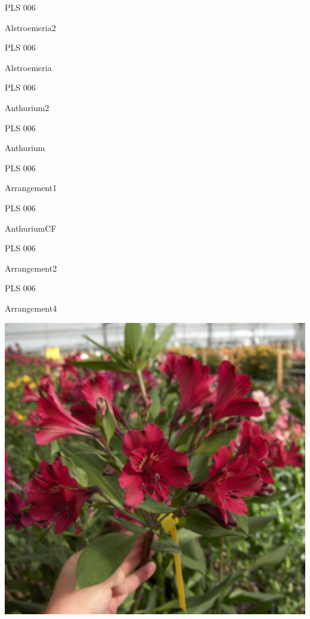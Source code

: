 \documentclass{article}
\begin{document}
\noindent  PLS 006
\vfill
\centerline{{\huge Alstroemeria2 }}
\vfill
\newpage

\noindent  PLS 006
\vfill
\centerline{{\huge Alstroemeria }}
\vfill
\newpage

\noindent  PLS 006
\vfill
\centerline{{\huge Anthurium2 }}
\vfill
\newpage

\noindent  PLS 006
\vfill
\centerline{{\huge Anthurium }}
\vfill
\newpage

\noindent  PLS 006
\vfill
\centerline{{\huge Arrangement1 }}
\vfill
\newpage

\noindent  PLS 006
\vfill
\centerline{{\huge AnthuriumCF }}
\vfill
\newpage

\noindent  PLS 006
\vfill
\centerline{{\huge Arrangement2 }}
\vfill
\newpage

\noindent  PLS 006
\vfill
\centerline{{\huge Arrangement4 }}
\vfill
\newpage

\begin{center}
\includegraphics[height=0.925\paperheight]{../Alstroemeria.jpg}
\end{center}
\newpage
\end{document}
